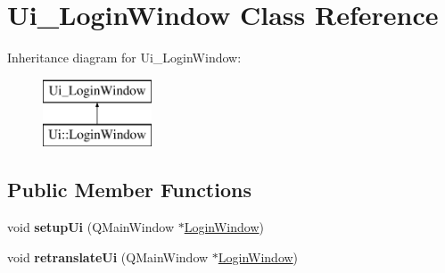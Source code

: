 \hypertarget{class_ui___login_window}{}\section{Ui\+\_\+\+Login\+Window Class Reference}
\label{class_ui___login_window}
Inheritance diagram for Ui\+\_\+\+Login\+Window\+:\begin{figure}[H]
\begin{center}
\leavevmode
\includegraphics[height=2.000000cm]{class_ui___login_window}
\end{center}
\end{figure}
\subsection*{Public Member Functions}
\begin{DoxyCompactItemize}
\item 
\mbox{\label{class_ui___login_window_af05a045f863b7820c382411b2a4bbcf6}} 
void {\bfseries setup\+Ui} (Q\+Main\+Window $\ast$\mbox{\hyperlink{class_login_window}{Login\+Window}})
\item 
\mbox{\label{class_ui___login_window_ae6b60c1f325e1e259cdf4b294338699b}} 
void {\bfseries retranslate\+Ui} (Q\+Main\+Window $\ast$\mbox{\hyperlink{class_login_window}{Login\+Window}})
\end{DoxyCompactItemize}
